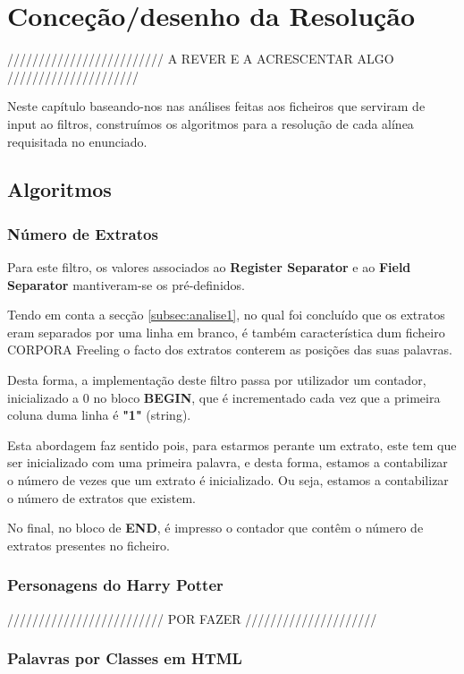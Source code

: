 \documentclass[11pt,a4paper]{report}
\begin{document}
\chapter{Conceção/desenho da Resolução}
\label{chap:concecao}

///////////////////////// A REVER E A ACRESCENTAR ALGO /////////////////////

Neste capítulo baseando-nos nas análises feitas aos ficheiros que serviram de input ao filtros, construímos os algoritmos para a resolução de cada alínea requisitada no enunciado.

\section{Algoritmos}
\subsection{Número de Extratos}

Para este filtro, os valores associados ao \textbf{Register Separator} e ao \textbf{Field Separator} mantiveram-se os pré-definidos.

Tendo em conta a secção \ref{subsec:analise1}, no qual foi concluído que os extratos eram separados por uma linha em branco, é também característica dum ficheiro CORPORA Freeling o facto dos extratos conterem as posições das suas palavras.

Desta forma, a implementação deste filtro passa por utilizador um contador, inicializado a 0 no bloco \textbf{BEGIN}, que é incrementado cada vez que a primeira coluna duma linha é \textbf{"1"} (string).

Esta abordagem faz sentido pois, para estarmos perante um extrato, este tem que ser inicializado com uma primeira palavra, e desta forma, estamos a contabilizar o número de vezes que um extrato é inicializado. Ou seja, estamos a contabilizar o número de extratos que existem.

No final, no bloco de \textbf{END}, é impresso o contador que contêm o número de extratos presentes no ficheiro.


\subsection{Personagens do Harry Potter}
\label{sub:algoritmos2}

///////////////////////// POR FAZER /////////////////////


\subsection{Palavras por Classes em HTML}
\label{sub:algoritmos3}
\end{document}
